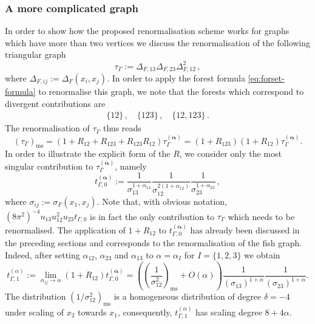 \documentclass[a4paper,10pt,twoside]{article}
\numberwithin{equation}{section}
\newcounter{and}
\def\ms{\mathrm{ms}}
\def\balpha{{\boldsymbol{\alpha}}}
\theoremstyle{plain}
\theoremstyle{definition}
\begin{document}
\subsubsection{A more complicated graph}
\label{sec:complicatedgraph}
In order to show how the proposed renormalisation scheme works for graphs which have more than two vertices we discuss the renormalisation of the following triangular graph
\[
\tau_\Gamma := \Delta_{F,13}\Delta_{F,23}\Delta_{F,12}^2\,,
\]
where $\Delta_{F,ij}:=\Delta_F(x_i,x_j)$. In order to apply the forest formula \eqref{eq:forset-formula} to renormalise this graph, we note that the forests which correspond to divergent contributions are 
\begin{gather*}
\{12\}\,,\quad\{123\}\,,\quad \{12,123\}\,.
\end{gather*} 
The renormalisation of $\tau_\Gamma$ thus reads
\[
(\tau_\Gamma)_\ms = (1+R_{12}+R_{123}+R_{123}R_{12}) \tau^{(\balpha)}_\Gamma   =   (1+R_{123})(1+R_{12}) \tau^{(\balpha)}_\Gamma.
\]
In order to illustrate the explicit form of the $R$, we consider only the most singular contribution to $\tau^{(\balpha)}_\Gamma$, namely
\[
t_{\Gamma,0}^{(\balpha)} := \frac{1}{\sigma_{13}^{1+\alpha_{13}}} \frac{1}{\sigma_{12}^{2(1+\alpha_{12})}} \frac{1}{\sigma_{23}^{1+\alpha_{23}}}\,,
\]
where $\sigma_{ij} := \sigma_F(x_1,x_j)$. Note that, with obvious notation, $(8\pi^2)^{-4}u_{13} u^2_{12} u_{23} t_{\Gamma,0}$ is in fact the only contribution to $\tau_\Gamma$ which needs to be renormalised. The application of $1+R_{12}$ to $t_{\Gamma,0}^{(\balpha)}$ has already been discussed in the preceding sections and corresponds to the renormalisation of the fish graph. Indeed, after setting $\alpha_{12}$, $\alpha_{23}$ and $\alpha_{13}$ to $\alpha=\alpha_I$ for $I=\{1,2,3\}$ we obtain
\[
t_{\Gamma,1}^{(\alpha)} := \lim_{\alpha_{ij}\to\alpha}(1+R_{12}) t_{\Gamma,0}^{(\balpha)}  = \left(\left(\frac{1}{\sigma_{12}^2}\right)_\ms + O(\alpha)\right)
\frac{1}{(\sigma_{13})^{1+\alpha}} \frac{1}{(\sigma_{23})^{1+\alpha}}.
\]
%
The distribution $(1/\sigma^2_{12})_\ms$ is a homogeneous distribution of degree $\delta=-4$ under scaling of $x_2$ towards $x_1$, consequently, $t_{\Gamma,1}^{(\alpha)}$ has scaling degree $8+4\alpha$. 
\end{document}

